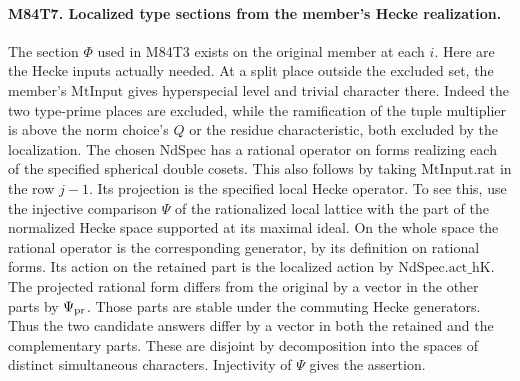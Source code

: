 \paragraph{M84T7. Localized type sections from the member's Hecke realization.}
The section $\Phi$ used in M84T3 exists on the original member at
each $i$. Here are the Hecke inputs actually needed. At a split
place outside the excluded set, the member's $\mathrm{MtInput}$
gives hyperspecial level and trivial character there. Indeed
the two type-prime places are excluded, while the ramification
of the tuple multiplier is above the norm choice's $Q$ or the
residue characteristic, both excluded by the localization.
The chosen $\mathrm{NdSpec}$ has a rational operator on forms
realizing each of the specified spherical double cosets. This
also follows by taking $\mathrm{MtInput}.\mathrm{rat}$ in the
row $j-1$. Its projection is the specified local Hecke
operator. To see this, use the injective comparison $\Psi$
of the rationalized local lattice with the part of the
normalized Hecke space supported at its maximal ideal. On
the whole space the rational operator is the corresponding
generator, by its definition on rational forms. Its action
on the retained part is the localized action by
$\mathrm{NdSpec}.\mathrm{act\_hK}$. The projected rational
form differs from the original by a vector in the other
parts by $\Psi_{\rm pr}$. Those parts are stable under the
commuting Hecke generators. Thus the two candidate answers
differ by a vector in both the retained and the complementary
parts. These are disjoint by decomposition into the spaces
of distinct simultaneous characters. Injectivity of $\Psi$
gives the assertion.

